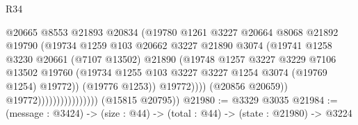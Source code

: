 \begin{lexlean}{R34}
\begin{coremodule}
                                            @20665
                                            @8553
                                            @21893
                                            @20834
                                            (@19780
                                              @1261
                                              @3227
                                              @20664
                                              @8068
                                              @21892
                                              @19790
                                              (@19734
                                                @1259
                                                @103
                                                @20662
                                                @3227
                                                @21890
                                                @3074
                                                (@19741
                                                  @1258
                                                  @3230
                                                  @20661
                                                  (@7107 @13502)
                                                  @21890
                                                  (@19748
                                                    @1257
                                                    @3227
                                                    @3229
                                                    @7106
                                                    @13502
                                                    @19760
                                                    (@19734
                                                      @1255
                                                      @103
                                                      @3227
                                                      @3227
                                                      @1254
                                                      @3074
                                                      (@19769 @1254)
                                                      @19772))
                                                  (@19776 @1253))
                                                @19772))))
                                        (@20856 @20659))
                                      @19772))))))))))))))))
      (@15815 @20795))
@21980 := @3329 @3035
@21984 := (message : @3424) -> (size : @44) -> (total : @44) -> (state : @21980) -> @3224

\end{coremodule}
\end{lexlean}
